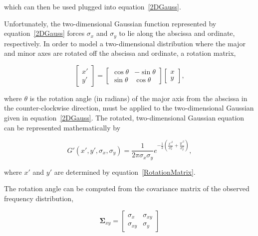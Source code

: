 \noindent which can then be used plugged into \mbox{equation \ref{2DGauss}}.

Unfortunately, the two-dimensional Gaussian function represented by \mbox{equation \ref{2DGauss}} forces $\sigma_x$ and $\sigma_y$ to lie along the abscissa and ordinate, respectively. In order to model a two-dimensional distribution where the major and minor axes are rotated off the abscissa and ordinate, a rotation matrix,

    \begin{equation}
        \label{RotationMatrix}
        \begin{bmatrix}
            x' \\ y'
        \end{bmatrix}
        =
        \begin{bmatrix}
            \cos{\theta} & -\sin{\theta} \\
            \sin{\theta} & \cos{\theta}
        \end{bmatrix}
        \begin{bmatrix}
            x \\ y
        \end{bmatrix},
    \end{equation}

\noindent where $\theta$ is the rotation angle (in radians) of the major axis from the abscissa in the counter-clockwise direction, must be applied to the two-dimensional Gaussian given in \mbox{equation \ref{2DGauss}}. The rotated, two-dimensional Gaussian equation can be represented mathematically by

    \begin{equation}
        \label{2DRotatedGauss}
        G'(x', y', \sigma_x, \sigma_y) = \frac{1}{2 \pi \sigma_x \sigma_y} e^{- \frac{1}{2} \left( \frac{x'^2}{\sigma_x^2} + \frac{y'^2}{\sigma_y^2} \right)},
    \end{equation}

\noindent where $x'$ and $y'$ are determined by \mbox{equation \ref{RotationMatrix}}.

The rotation angle can be computed from the covariance matrix of the observed frequency distribution,

    \begin{equation}
        \label{CovMatrix}
        \boldsymbol{\Sigma}_{xy} =
        \begin{bmatrix}
            \sigma_x & \sigma_{xy} \\
            \sigma_{xy} & \sigma_y
        \end{bmatrix}
    \end{equation}

